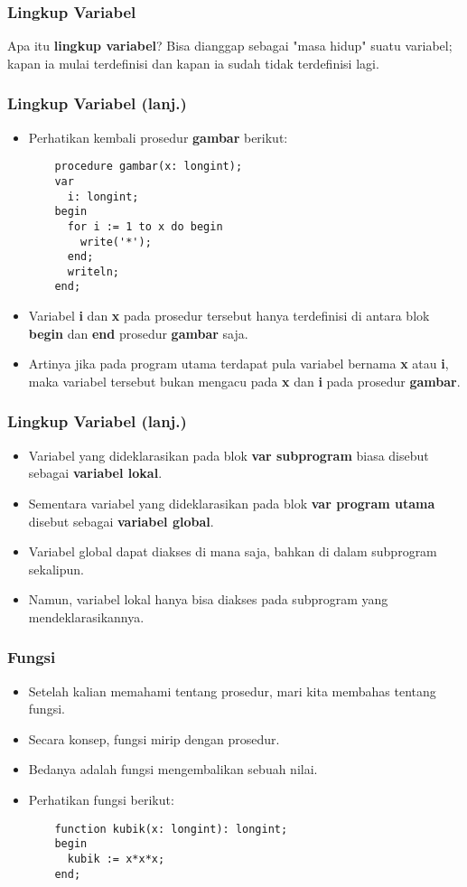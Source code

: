 \begin{frame}[fragile]
\frametitle{Lingkup Variabel}
\begin{block}{Apa itu \textbf{lingkup variabel}?}
Bisa dianggap sebagai "masa hidup" suatu variabel; kapan ia mulai terdefinisi dan kapan ia sudah tidak terdefinisi lagi.
\end{block}
\end{frame}

\begin{frame}[fragile]
\frametitle{Lingkup Variabel (lanj.)}
\begin{itemize}
  \item Perhatikan kembali prosedur \textbf{gambar} berikut:
  \begin{lstlisting}
    procedure gambar(x: longint);
    var
      i: longint;
    begin
      for i := 1 to x do begin
        write('*');
      end;
      writeln;
    end;
  \end{lstlisting}
  \item Variabel \textbf{i} dan \textbf{x} pada prosedur tersebut hanya terdefinisi di antara blok \textbf{begin} dan \textbf{end} prosedur \textbf{gambar} saja.
  \item Artinya jika pada program utama terdapat pula variabel bernama \textbf{x} atau \textbf{i}, maka variabel tersebut \alert{bukan} mengacu pada \textbf{x} dan \textbf{i} pada prosedur \textbf{gambar}.
\end{itemize}
\end{frame}

\begin{frame}[fragile]
\frametitle{Lingkup Variabel (lanj.)}
\begin{itemize}
  \item Variabel yang dideklarasikan pada blok \textbf{var subprogram} biasa disebut sebagai \textbf{variabel lokal}.
  \item Sementara variabel yang dideklarasikan pada blok \textbf{var program utama} disebut sebagai \textbf{variabel global}.
  \item Variabel global dapat diakses di mana saja, bahkan di dalam subprogram sekalipun.
  \item Namun, variabel lokal hanya bisa diakses pada subprogram yang mendeklarasikannya.
\end{itemize}
\end{frame}

\begin{frame}[fragile]
\frametitle{Fungsi}
\begin{itemize}
  \item Setelah kalian memahami tentang prosedur, mari kita membahas tentang fungsi.
  \item Secara konsep, fungsi mirip dengan prosedur.
  \item Bedanya adalah fungsi \alert{mengembalikan sebuah nilai}.
  \item Perhatikan fungsi berikut:
  \begin{lstlisting}
    function kubik(x: longint): longint;
    begin
      kubik := x*x*x;
    end;
  \end{lstlisting}
\end{itemize}
\end{frame}

